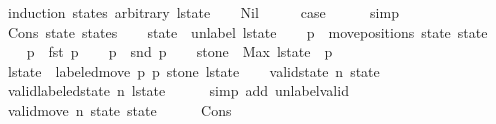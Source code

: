 \begin{isabellebody}
\ {\isacharparenleft}induction\ states\ arbitrary{\isacharcolon}\ l{\isacharunderscore}state{\isacharparenright}\isanewline
\ \ \isamarkupfalse%
\ Nil\isanewline
\ \ \isamarkupfalse%
\ \isamarkupfalse%
\ {\isacharquery}case\isanewline
\ \ \ \ \isamarkupfalse%
\ simp\isanewline
{}\isamarkupfalse%
\isanewline
\ \ \isamarkupfalse%
\ {\isacharparenleft}Cons\ state{\isacharprime}\ states{\isacharparenright}\isanewline
\ \ \isamarkupfalse%
\ {\isacharquery}state\ {\isacharequal}\ {\isachardoublequoteopen}unlabel\ l{\isacharunderscore}state{\isachardoublequoteclose}\isanewline
\ \ \isamarkupfalse%
\ {\isacharquery}p\ {\isacharequal}\ {\isachardoublequoteopen}move{\isacharunderscore}positions\ {\isacharquery}state\ state{\isacharprime}{\isachardoublequoteclose}\isanewline
\ \ \isamarkupfalse%
\ {\isacharquery}p{}\ {\isacharequal}\ {\isachardoublequoteopen}fst\ {\isacharquery}p{\isachardoublequoteclose}\isanewline
\ \ \isamarkupfalse%
\ {\isacharquery}p{}\ {\isacharequal}\ {\isachardoublequoteopen}snd\ {\isacharquery}p{\isachardoublequoteclose}\isanewline
\ \ \isamarkupfalse%
\ {\isacharquery}stone\ {\isacharequal}\ {\isachardoublequoteopen}Max\ {\isacharparenleft}l{\isacharunderscore}state\ {\isacharbang}\ {\isacharquery}p{}{\isacharparenright}{\isachardoublequoteclose}\isanewline
\ \ \isamarkupfalse%
\ {\isacharquery}l{\isacharunderscore}state{\isacharprime}\ {\isacharequal}\ {\isachardoublequoteopen}labeled{\isacharunderscore}move\ {\isacharquery}p{}\ {\isacharquery}p{}\ {\isacharquery}stone\ l{\isacharunderscore}state{\isachardoublequoteclose}\isanewline
\isanewline
\ \ \isamarkupfalse%
\ {\isachardoublequoteopen}valid{\isacharunderscore}state\ n\ {\isacharquery}state{\isachardoublequoteclose}\isanewline
\ \ \ \ \isamarkupfalse%
\ {\isacharbackquoteopen}valid{\isacharunderscore}labeled{\isacharunderscore}state\ n\ l{\isacharunderscore}state{\isacharbackquoteclose}\isanewline
\ \ \ \ \isamarkupfalse%
\ {\isacharparenleft}simp\ add{\isacharcolon}\ unlabel{\isacharunderscore}valid{\isacharparenright}\isanewline
\isanewline
\ \ \isamarkupfalse%
\ {\isachardoublequoteopen}valid{\isacharunderscore}move\ n\ {\isacharquery}state\ state{\isacharprime}{\isachardoublequoteclose}\isanewline
\ \ \ \ \isamarkupfalse%
\ Cons{\isacharparenleft}{}{\isacharparenright}\isanewline

\end{isabellebody}
